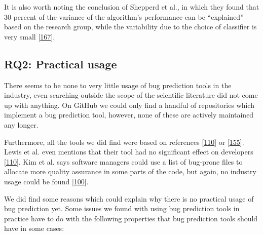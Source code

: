 \documentclass[]{book}
\begin{document}
It is also worth noting the conclusion of Shepperd et al., in which they
found that 30 percent of the variance of the algorithm's performance can
be ``explained'' based on the research group, while the variability due
to the choice of classifier is very small
{[}\protect\hyperlink{ref-Shepperd2014}{167}{]}.

\subsection{RQ2: Practical usage}\label{rq2-practical-usage}

There seems to be none to very little usage of bug prediction tools in
the industry, even searching outside the scope of the scientific
literature did not come up with anything. On GitHub we could only find a
handful of repositories which implement a bug prediction tool, however,
none of these are actively maintained any longer.

Furthermore, all the tools we did find were based on references
{[}\protect\hyperlink{ref-Lewis2013}{110}{]} or
{[}\protect\hyperlink{ref-rahman2011}{155}{]}. Lewis et al. even
mentions that their tool had no significant effect on developers
{[}\protect\hyperlink{ref-Lewis2013}{110}{]}. Kim et al. says software
managers could use a list of bug-prone files to allocate more quality
assurance in some parts of the code, but again, no industry usage could
be found {[}\protect\hyperlink{ref-kim2007}{100}{]}.

We did find some reasons which could explain why there is no practical
usage of bug prediction yet. Some issues we found with using bug
prediction tools in practice have to do with the following properties
that bug prediction tools should have in some cases:
\end{document}
